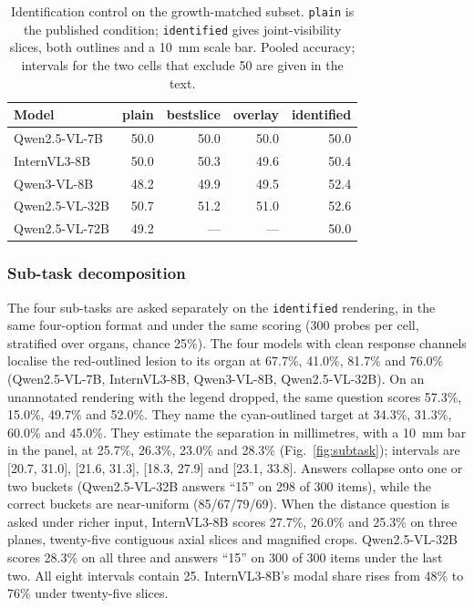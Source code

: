 \begin{table}[!t]
\caption{Identification control on the growth-matched subset. \texttt{plain}
is the published condition; \texttt{identified} gives joint-visibility
slices, both outlines and a 10~mm scale bar. Pooled accuracy; intervals
for the two cells that exclude 50 are given in the text.}
\label{tab:ident}
\centering
\fontsize{7.5}{9}\selectfont
\setlength\tabcolsep{3pt}
\begin{tabular}{lrrrr}
\toprule
Model & plain & bestslice & overlay & identified \\
\midrule
Qwen2.5-VL-7B & 50.0 & 50.0 & 50.0 & 50.0 \\
InternVL3-8B & 50.0 & 50.3 & 49.6 & 50.4 \\
Qwen3-VL-8B & 48.2 & 49.9 & 49.5 & 52.4 \\
Qwen2.5-VL-32B & 50.7 & 51.2 & 51.0 & 52.6 \\
Qwen2.5-VL-72B & 49.2 & --- & --- & 50.0 \\
\bottomrule
\end{tabular}
\end{table}

\subsubsection{Sub-task decomposition} The four sub-tasks are asked separately
on the \texttt{identified} rendering, in the same four-option format and
under the same scoring (300 probes per cell, stratified over organs, chance
25\%). The four models with clean response channels localise the
red-outlined lesion to its organ at 67.7\%, 41.0\%, 81.7\% and 76.0\%
(Qwen2.5-VL-7B, InternVL3-8B, Qwen3-VL-8B, Qwen2.5-VL-32B). On an
unannotated rendering with the legend dropped, the same question scores
57.3\%, 15.0\%, 49.7\% and 52.0\%. They name
the cyan-outlined target at 34.3\%, 31.3\%, 60.0\% and 45.0\%. They estimate
the separation in millimetres, with a 10~mm bar in the panel, at 25.7\%,
26.3\%, 23.0\% and 28.3\% (Fig.~\ref{fig:subtask}); intervals are
[20.7, 31.0], [21.6, 31.3], [18.3, 27.9] and [23.1, 33.8]. Answers collapse
onto one or two buckets (Qwen2.5-VL-32B answers ``15'' on 298 of 300
items), while the correct buckets are near-uniform (85/67/79/69). When the
distance question is asked under richer input, InternVL3-8B scores 27.7\%,
26.0\% and 25.3\% on three planes, twenty-five contiguous axial slices and
magnified crops. Qwen2.5-VL-32B scores 28.3\% on all three and answers
``15'' on 300 of 300 items under the last two. All eight intervals contain
25. InternVL3-8B's modal share rises from 48\% to 76\% under twenty-five
slices.

